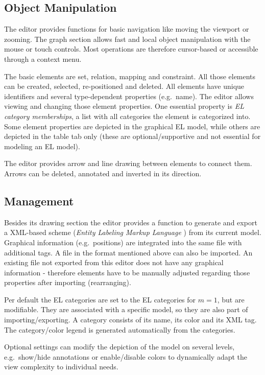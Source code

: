 \documentclass[twoside, openright, 12pt]{book}
\begin{document}
\subsection{Object Manipulation}
\label{req_object_manipulation}
The editor provides functions for basic navigation like moving the viewport or zooming.
The graph section allows fast and local object manipulation with the mouse or touch controls.
Most operations are therefore cursor-based or accessible through a context menu.

The basic elements are set, relation, mapping and constraint.
All those elements can be created, selected, re-positioned and deleted.
All elements have unique identifiers and several type-dependent properties (e.g.\ name).
The editor allows viewing and changing those element properties.
One essential property is \textit{EL category memberships}, a list with all categories the element is categorized into.
Some element properties are depicted in the graphical EL model, while others are depicted in the table tab only (these are optional/supportive and not essential for modeling an EL model).

The editor provides arrow and line drawing between elements to connect them.
Arrows can be deleted, annotated and inverted in its direction.



\subsection{Management}
\label{req_management}
Besides its drawing section the editor provides a function to generate and export a XML-based scheme (\textit{Entity Labeling Markup Language} \citep{Amthor18}) from its current model.
Graphical information (e.g.\ positions) are integrated into the same file with additional tags.
A file in the format mentioned above can also be imported.
An existing file not exported from this editor does not have any graphical information - therefore elements have to be manually adjusted regarding those properties after importing (rearranging).

Per default the EL categories are set to the EL categories for $m=1$, but are modifiable.
They are associated with a specific model, so they are also part of importing/exporting.
A category consists of its name, its color and its XML tag.
The category/color legend is generated automatically from the categories.

Optional settings can modify the depiction of the model on several levels, e.g.\ show/hide annotations or enable/disable colors to dynamically adapt the view complexity to individual needs.
\end{document}
